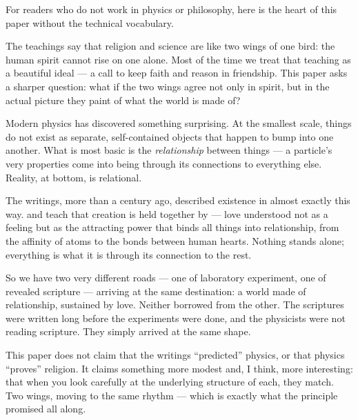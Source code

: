 For readers who do not work in physics or philosophy, here is the heart of
this paper without the technical vocabulary.

The \bahai teachings say that religion and science are like two wings of one
bird: the human spirit cannot rise on one alone. Most of the time we treat
that teaching as a beautiful ideal --- a call to keep faith and reason in
friendship. This paper asks a sharper question: what if the two wings agree
not only in spirit, but in the actual picture they paint of what the world is
made of?

Modern physics has discovered something surprising. At the smallest scale,
things do not exist as separate, self-contained objects that happen to bump
into one another. What is most basic is the \emph{relationship} between
things --- a particle's very properties come into being through its
connections to everything else. Reality, at bottom, is relational.

The \bahai writings, more than a century ago, described existence in almost
exactly this way. \Bahaullah and \AbdulBaha teach that creation is held
together by \mahabbat --- love understood not as a feeling but as the
attracting power that binds all things into relationship, from the affinity
of atoms to the bonds between human hearts. Nothing stands alone; everything
is what it is through its connection to the rest.

So we have two very different roads --- one of laboratory experiment, one of
revealed scripture --- arriving at the same destination: a world made of
relationship, sustained by love. Neither borrowed from the other. The
scriptures were written long before the experiments were done, and the
physicists were not reading scripture. They simply arrived at the same shape.

This paper does not claim that the \bahai writings ``predicted'' physics, or
that physics ``proves'' religion. It claims something more modest and, I
think, more interesting: that when you look carefully at the underlying
structure of each, they match. Two wings, moving to the same rhythm --- which
is exactly what the principle promised all along.
